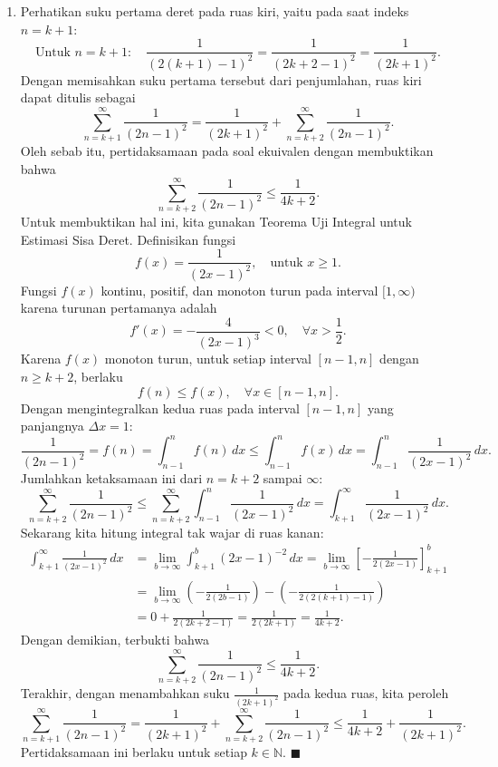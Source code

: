 \documentclass[a4paper]{article}
\begin{document}
\begin{enumerate}
  \item  Perhatikan suku pertama deret pada ruas kiri, yaitu pada saat indeks $n = k+1$:
        \[
          \text{Untuk } n = k+1: \quad \frac{1}{(2(k+1)-1)^2} = \frac{1}{(2k+2-1)^2} = \frac{1}{(2k+1)^2}.
        \]
        Dengan memisahkan suku pertama tersebut dari penjumlahan, ruas kiri dapat ditulis sebagai
        \[
          \sum_{n=k+1}^\infty \frac{1}{(2n-1)^2} = \frac{1}{(2k+1)^2} + \sum_{n=k+2}^\infty \frac{1}{(2n-1)^2}.
        \]
        Oleh sebab itu, pertidaksamaan pada soal ekuivalen dengan membuktikan bahwa
        \[
          \sum_{n=k+2}^\infty \frac{1}{(2n-1)^2} \le \frac{1}{4k+2}.
        \]
        Untuk membuktikan hal ini, kita gunakan Teorema Uji Integral untuk Estimasi Sisa Deret.
        Definisikan fungsi
        \[
          f(x) = \frac{1}{(2x-1)^2}, \quad \text{untuk } x \ge 1.
        \]
        Fungsi $f(x)$ kontinu, positif, dan monoton turun pada interval $[1, \infty)$ karena turunan pertamanya adalah
        \[
          f'(x) = -\frac{4}{(2x-1)^3} < 0, \quad \forall x > \frac{1}{2}.
        \]
        Karena $f(x)$ monoton turun, untuk setiap interval $[n-1, n]$ dengan $n \ge k+2$, berlaku
        \[
          f(n) \le f(x), \quad \forall x \in [n-1, n].
        \]
        Dengan mengintegralkan kedua ruas pada interval $[n-1, n]$ yang panjangnya $\Delta x = 1$:
        \[
          \frac{1}{(2n-1)^2} = f(n) = \int_{n-1}^n f(n) \, dx \le \int_{n-1}^n f(x) \, dx = \int_{n-1}^n \frac{1}{(2x-1)^2} \, dx.
        \]
        Jumlahkan ketaksamaan ini dari $n = k+2$ sampai $\infty$:
        \[
          \sum_{n=k+2}^\infty \frac{1}{(2n-1)^2} \le \sum_{n=k+2}^\infty \int_{n-1}^n \frac{1}{(2x-1)^2} \, dx = \int_{k+1}^\infty \frac{1}{(2x-1)^2} \, dx.
        \]
        Sekarang kita hitung integral tak wajar di ruas kanan:
        \begin{align*}
          \int_{k+1}^\infty \frac{1}{(2x-1)^2} \, dx
           & = \lim_{b \to \infty} \int_{k+1}^b (2x-1)^{-2} \, dx = \lim_{b \to \infty} \left[ -\frac{1}{2(2x-1)} \right]_{k+1}^b                                                                                     \\
           & = \lim_{b \to \infty} \left( -\frac{1}{2(2b-1)} \right) - \left( -\frac{1}{2(2(k+1)-1)} \right)                                                                                                          \\
           & = 0 + \frac{1}{2(2k+2-1)}                                                                                            = \frac{1}{2(2k+1)}                                               = \frac{1}{4k+2}.
        \end{align*}
        Dengan demikian, terbukti bahwa
        \[
          \sum_{n=k+2}^\infty \frac{1}{(2n-1)^2} \le \frac{1}{4k+2}.
        \]
        Terakhir, dengan menambahkan suku $\frac{1}{(2k+1)^2}$ pada kedua ruas, kita peroleh
        \[
          \sum_{n=k+1}^\infty \frac{1}{(2n-1)^2} = \frac{1}{(2k+1)^2} + \sum_{n=k+2}^\infty \frac{1}{(2n-1)^2} \le \frac{1}{4k+2} + \frac{1}{(2k+1)^2}.
        \]
        Pertidaksamaan ini berlaku untuk setiap $k \in \mathbb{N}$.
        \hfill $\blacksquare$
\end{enumerate}
\end{document}
